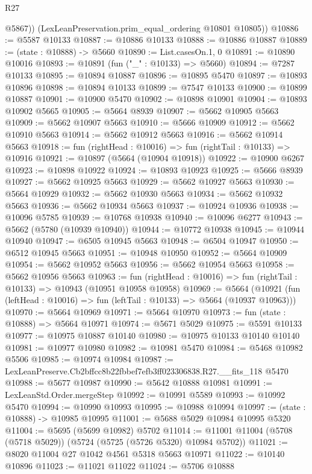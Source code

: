 \begin{lexlean}{R27}
\begin{coremodule}
          @5867))
      (LexLeanPreservation.prim_equal_ordering @10801 @10805))
@10886 := @5587 @10133
@10887 := @10886 @10133
@10888 := @10886 @10887
@10889 := (state : @10888) -> @5660
@10890 := List.casesOn.{1, 0}
@10891 := @10890 @10016
@10893 := @10891 (fun ("_" : @10133) => @5660)
@10894 := @7287 @10133
@10895 := @10894 @10887
@10896 := @10895 @5470
@10897 := @10893 @10896
@10898 := @10894 @10133
@10899 := @7547 @10133
@10900 := @10899 @10887
@10901 := @10900 @5470
@10902 := @10898 @10901
@10904 := @10893 @10902 @5665
@10905 := @5664 @8939
@10907 := @5662 @10905 @5663
@10909 := @5662 @10907 @5663
@10910 := @5666 @10909
@10912 := @5662 @10910 @5663
@10914 := @5662 @10912 @5663
@10916 := @5662 @10914 @5663
@10918 := fun (rightHead : @10016) => fun (rightTail : @10133) => @10916
@10921 := @10897 (@5664 (@10904 @10918))
@10922 := @10900 @6267
@10923 := @10898 @10922
@10924 := @10893 @10923
@10925 := @5666 @8939
@10927 := @5662 @10925 @5663
@10929 := @5662 @10927 @5663
@10930 := @5664 @10929
@10932 := @5662 @10930 @5663
@10934 := @5662 @10932 @5663
@10936 := @5662 @10934 @5663
@10937 := @10924 @10936
@10938 := @10096 @5785
@10939 := @10768 @10938
@10940 := @10096 @6277
@10943 := @5662 (@5780 (@10939 @10940))
@10944 := @10772 @10938
@10945 := @10944 @10940
@10947 := @6505 @10945 @5663
@10948 := @6504 @10947
@10950 := @6512 @10945 @5663
@10951 := @10948 @10950
@10952 := @5664 @10909
@10954 := @5662 @10952 @5663
@10956 := @5662 @10954 @5663
@10958 := @5662 @10956 @5663
@10963 := fun (rightHead : @10016) => fun (rightTail : @10133) => @10943 (@10951 @10958 @10958)
@10969 := @5664
    (@10921 (fun (leftHead : @10016) => fun (leftTail : @10133) => @5664 (@10937 @10963)))
@10970 := @5664 @10969
@10971 := @5664 @10970
@10973 := fun (state : @10888) => @5664 @10971
@10974 := @5671 @5029
@10975 := @5591 @10133
@10977 := @10975 @10887 @10140
@10980 := @10975 @10133 @10140 @10140
@10981 := @10977 @10980
@10982 := @10981 @5470
@10984 := @5468 @10982 @5506
@10985 := @10974 @10984
@10987 := LexLeanPreserve.Cb2bffcc8b22fbbef7efb3ff023306838.R27.__fits_118 @5470
@10988 := @5677 @10987
@10990 := @5642 @10888 @10981
@10991 := LexLeanStd.Order.mergeStep
@10992 := @10991 @5589
@10993 := @10992 @5470
@10994 := @10990 @10993
@10995 := @10988 @10994
@10997 := (state : @10888) -> @10985 @10995
@11001 := @5688 @5029 @10984 @10995 @5320
@11004 := @5695 (@5699 @10982) @5702
@11014 := @11001 @11004 (@5708 (@5718 @5029)) (@5724 (@5725 (@5726 @5320) @10984 @5702))
@11021 := @8020 @11004 @27 @1042 @4561 @5318 @5663 @10971
@11022 := @10140 @10896
@11023 := @11021 @11022
@11024 := @5706 @10888

\end{coremodule}
\end{lexlean}

